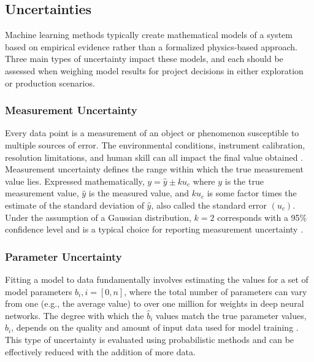 \subsection{Uncertainties} \label{ch2:uncertainty}
Machine learning methods typically create mathematical models of a system based on empirical evidence rather than a formalized physics-based approach. Three main types of uncertainty impact these models, and each should be assessed when weighing model results for project decisions in either exploration or production scenarios. 

\subsubsection{Measurement Uncertainty}\label{ch2:measurement_uncertainty}
Every data point is a measurement of an object or phenomenon susceptible to multiple sources of error. The environmental conditions, instrument calibration, resolution limitations, and human skill can all impact the final value obtained \citep[p.\ 11-14]{baird_experimentation_1962}. Measurement uncertainty defines the range within which the true measurement value lies. Expressed mathematically, $y=\hat{y} \pm ku_c$ where $y$ is the true measurement value, $\hat{y}$ is the measured value, and $ku_c$ is some factor times the estimate of the standard deviation of $\hat{y}$, also called the standard error $(u_c)$. Under the assumption of a Gaussian distribution, $k=2$ corresponds with a 95\% confidence level and is a typical choice for reporting measurement uncertainty \citep{nist_nist_2021}.

\subsubsection{Parameter Uncertainty}\label{ch2:parameter_uncertainty}
Fitting a model to data fundamentally involves estimating the values for a set of model parameters $b_i, i = [0, n]$, where the total number of parameters can vary from one (e.g., the average value) to over one million for weights in deep neural networks. The degree with which the $\hat{b}_i$ values match the true parameter values, $b_i$, depends on the quality and amount of input data used for model training \citep[p.\ 81]{james_introduction_2013}. This type of uncertainty is evaluated using probabilistic methods and can be effectively reduced with the addition of more data. 

